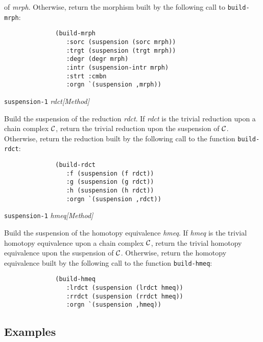 {{of {\em mrph}. Otherwise, return the morphism built by the following call to
{\tt build-mrph}:
{\footnotesize\begin{verbatim}
              (build-mrph
                 :sorc (suspension (sorc mrph))
                 :trgt (suspension (trgt mrph))
                 :degr (degr mrph)
                 :intr (suspension-intr mrph)
                 :strt :cmbn
                 :orgn `(suspension ,mrph))
\end{verbatim}}
\par}
{\leftskip=5mm
{\tt suspension-1} {\em rdct}\hfill{\em[Method]} \par}
{\leftskip=15mm
Build the suspension of the reduction {\em rdct}. If {\em rdct} is the trivial
reduction upon a chain complex ${\cal C}$, return the trivial reduction upon
the suspension of ${\cal C}$. Otherwise, return the reduction built by the following call to
the function {\tt build-rdct}:
{\footnotesize\begin{verbatim}
              (build-rdct
                 :f (suspension (f rdct))
                 :g (suspension (g rdct))
                 :h (suspension (h rdct))
                 :orgn `(suspension ,rdct))
\end{verbatim}}
\par}
{\leftskip=5mm
{\tt suspension-1} {\em hmeq}\hfill{\em[Method]} \par}
{\leftskip=15mm
Build the suspension of the  homotopy equivalence {\em hmeq}. If {\em hmeq} is the trivial
homotopy equivalence  upon a chain complex ${\cal C}$, return the trivial homotopy equivalence upon
the suspension of ${\cal C}$. O\-ther\-wi\-se, return the homotopy equivalence built by the following call to
the function {\tt build-hmeq}:
{\footnotesize\begin{verbatim}
              (build-hmeq
                 :lrdct (suspension (lrdct hmeq))
                 :rrdct (suspension (rrdct hmeq))
                 :orgn `(suspension ,hmeq))
\end{verbatim}}
\par}
}

\subsection* {Examples}

